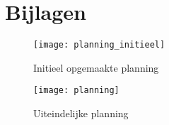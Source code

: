 \chapter{Bijlagen}



\begin{figure}[H]
	\centering
	\texttt{[image: planning\_initieel]}
	\caption{Initieel opgemaakte planning}
	\label{fig:planning}
\end{figure}

\begin{figure}[H]
	\centering
	\texttt{[image: planning]}
	\caption{Uiteindelijke planning}
	\label{fig:planning}
\end{figure}

